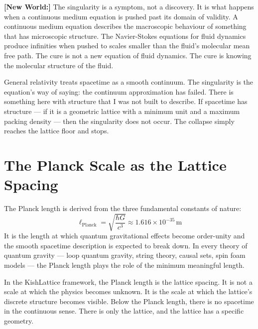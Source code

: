 \documentclass[11pt, letterpaper, openany]{book}
\newcommand{\newworld}[1]{\noindent\textbf{\color{kishblue}[New World:]}
  #1\medskip}
\begin{document}
\newworld{The singularity is a symptom, not a discovery. It is what happens
when a continuous medium equation is pushed past its domain of validity.
A continuous medium equation describes the macroscopic behaviour of something
that has microscopic structure. The Navier-Stokes equations for fluid dynamics
produce infinities when pushed to scales smaller than the fluid's molecular
mean free path. The cure is not a new equation of fluid dynamics. The cure
is knowing the molecular structure of the fluid.

General relativity treats spacetime as a smooth continuum. The singularity
is the equation's way of saying: the continuum approximation has failed.
There is something here with structure that I was not built to describe.
If spacetime has structure --- if it is a geometric lattice with a minimum
unit and a maximum packing density --- then the singularity does not occur.
The collapse simply reaches the lattice floor and stops.}

\section{The Planck Scale as the Lattice Spacing}

The Planck length is derived from the three fundamental constants of nature:
\[
\ell_\text{Planck} = \sqrt{\frac{\hbar G}{c^3}} \approx 1.616 \times 10^{-35}\,\text{m}
\]
It is the length at which quantum gravitational effects become order-unity
and the smooth spacetime description is expected to break down. In every
theory of quantum gravity --- loop quantum gravity, string theory, causal
sets, spin foam models --- the Planck length plays the role of the minimum
meaningful length.

In the KishLattice framework, the Planck length is the lattice spacing.
It is not a scale at which the physics becomes unknown. It is the scale
at which the lattice's discrete structure becomes visible. Below the
Planck length, there is no spacetime in the continuous sense. There is
only the lattice, and the lattice has a specific geometry.
\end{document}
